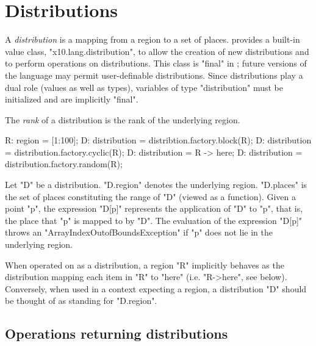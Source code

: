 \section{Distributions}\label{XtenDistributions}

A {\em distribution} is a mapping from a region to a set of places.
{}\Xten{} provides a built-in value class, \xcd"x10.lang.distribution", to allow the creation of new distributions and
to perform operations on distributions. This class is \xcd"final" in
{}\XtenCurrVer; future versions of the language may permit
user-definable distributions. Since distributions play a dual role
(values as well as types), variables of type \xcd"distribution" must
be initialized and are implicitly \xcd"final".

The {\em rank} of a distribution is the rank of the underlying region.



\begin{xten}
R: region = [1:100];
D: distribution = distribtion.factory.block(R);
D: distribution = distribution.factory.cyclic(R);
D: distribution = R -> here;
D: distribution = distribution.factory.random(R);
\end{xten}

Let \xcd"D" be a distribution. \xcd"D.region" denotes the underlying
region. \xcd"D.places" is the set of places constituting the range of
\xcd"D" (viewed as a function). Given a point \xcd"p", the expression
\xcd"D[p]" represents the application of \xcd"D" to \xcd"p", that is,
the place that \xcd"p" is mapped to by \xcd"D". The evaluation of the
expression \xcd"D[p]" throws an \xcd"ArrayIndexOutofBoundsException"
if \xcd"p" does not lie in the underlying region.

When operated on as a distribution, a region \xcd"R" implicitly
behaves as the distribution mapping each item in \xcd"R" to \xcd"here"
(i.e.{} \xcd"R->here", see below). Conversely, when used in a context
expecting a region, a distribution \xcd"D" should be thought of as
standing for \xcd"D.region".

{}

\subsection{Operations returning distributions}

